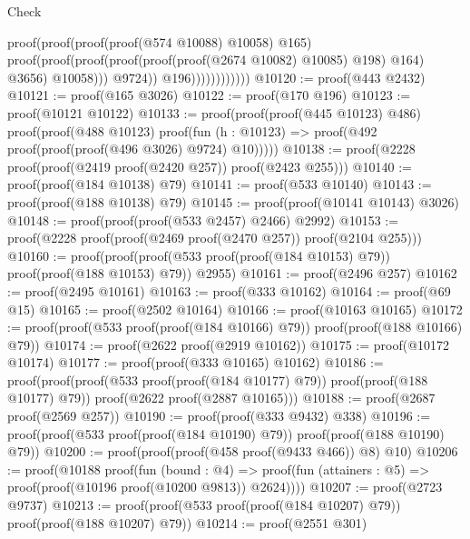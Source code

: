 \begin{lexlean}{Check}
\begin{coremodule}
                                                      proof(proof(proof(proof(@574 @10088) @10058)
                                                            @165)
                                                          proof(proof(proof(proof(proof(proof(@2674
                                                                        @10082)
                                                                      @10085)
                                                                    @198)
                                                                  @164)
                                                                @3656)
                                                              @10058)))
                                                    @9724))
                                              @196))))))))))))
@10120 := proof(@443 @2432)
@10121 := proof(@165 @3026)
@10122 := proof(@170 @196)
@10123 := proof(@10121 @10122)
@10133 := proof(proof(proof(@445 @10123) @486)
      proof(proof(@488 @10123)
          proof(fun (h : @10123) => proof(@492 proof(proof(proof(@496 @3026) @9724) @10)))))
@10138 := proof(@2228 proof(proof(@2419 proof(@2420 @257)) proof(@2423 @255)))
@10140 := proof(proof(@184 @10138) @79)
@10141 := proof(@533 @10140)
@10143 := proof(proof(@188 @10138) @79)
@10145 := proof(proof(@10141 @10143) @3026)
@10148 := proof(proof(proof(@533 @2457) @2466) @2992)
@10153 := proof(@2228 proof(proof(@2469 proof(@2470 @257)) proof(@2104 @255)))
@10160 := proof(proof(proof(@533 proof(proof(@184 @10153) @79)) proof(proof(@188 @10153) @79))
      @2955)
@10161 := proof(@2496 @257)
@10162 := proof(@2495 @10161)
@10163 := proof(@333 @10162)
@10164 := proof(@69 @15)
@10165 := proof(@2502 @10164)
@10166 := proof(@10163 @10165)
@10172 := proof(proof(@533 proof(proof(@184 @10166) @79)) proof(proof(@188 @10166) @79))
@10174 := proof(@2622 proof(@2919 @10162))
@10175 := proof(@10172 @10174)
@10177 := proof(proof(@333 @10165) @10162)
@10186 := proof(proof(proof(@533 proof(proof(@184 @10177) @79)) proof(proof(@188 @10177) @79))
      proof(@2622 proof(@2887 @10165)))
@10188 := proof(@2687 proof(@2569 @257))
@10190 := proof(proof(@333 @9432) @338)
@10196 := proof(proof(@533 proof(proof(@184 @10190) @79)) proof(proof(@188 @10190) @79))
@10200 := proof(proof(proof(@458 proof(@9433 @466)) @8) @10)
@10206 := proof(@10188
      proof(fun (bound : @4) =>
        proof(fun (attainers : @5) => proof(proof(@10196 proof(@10200 @9813)) @2624))))
@10207 := proof(@2723 @9737)
@10213 := proof(proof(@533 proof(proof(@184 @10207) @79)) proof(proof(@188 @10207) @79))
@10214 := proof(@2551 @301)

\end{coremodule}
\end{lexlean}
